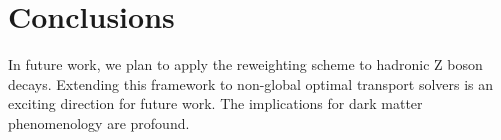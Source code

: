 \section{Conclusions}\label{sec:conclusions}

In future work, we plan to apply the reweighting scheme to hadronic Z
boson decays. Extending this framework to non-global optimal transport
solvers is an exciting direction for future work. The implications for
dark matter phenomenology are profound.

